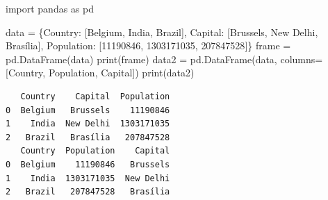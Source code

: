 \documentclass[
  polish,
  letterpaper,
  DIV=11,
  numbers=noendperiod]{scrreprt}
\newenvironment{Shaded}{\begin{snugshade}}{\end{snugshade}}
\newcommand{\BuiltInTok}[1]{\textcolor[rgb]{0.00,0.23,0.31}{#1}}
\newcommand{\DecValTok}[1]{\textcolor[rgb]{0.68,0.00,0.00}{#1}}
\newcommand{\ImportTok}[1]{\textcolor[rgb]{0.00,0.46,0.62}{#1}}
\newcommand{\NormalTok}[1]{\textcolor[rgb]{0.00,0.23,0.31}{#1}}
\newcommand{\OperatorTok}[1]{\textcolor[rgb]{0.37,0.37,0.37}{#1}}
\newcommand{\StringTok}[1]{\textcolor[rgb]{0.13,0.47,0.30}{#1}}
\begin{document}
\begin{Shaded}
\begin{Highlighting}[]
\ImportTok{import}\NormalTok{ pandas }\ImportTok{as}\NormalTok{ pd}

\NormalTok{data }\OperatorTok{=}\NormalTok{ \{}\StringTok{\textquotesingle{}Country\textquotesingle{}}\NormalTok{: [}\StringTok{\textquotesingle{}Belgium\textquotesingle{}}\NormalTok{, }\StringTok{\textquotesingle{}India\textquotesingle{}}\NormalTok{, }\StringTok{\textquotesingle{}Brazil\textquotesingle{}}\NormalTok{],}
        \StringTok{\textquotesingle{}Capital\textquotesingle{}}\NormalTok{: [}\StringTok{\textquotesingle{}Brussels\textquotesingle{}}\NormalTok{, }\StringTok{\textquotesingle{}New Delhi\textquotesingle{}}\NormalTok{, }\StringTok{\textquotesingle{}Brasília\textquotesingle{}}\NormalTok{],}
        \StringTok{\textquotesingle{}Population\textquotesingle{}}\NormalTok{: [}\DecValTok{11190846}\NormalTok{, }\DecValTok{1303171035}\NormalTok{, }\DecValTok{207847528}\NormalTok{]\}}
\NormalTok{frame }\OperatorTok{=}\NormalTok{ pd.DataFrame(data)}
\BuiltInTok{print}\NormalTok{(frame)}
\NormalTok{data2 }\OperatorTok{=}\NormalTok{ pd.DataFrame(data, columns}\OperatorTok{=}\NormalTok{[}\StringTok{\textquotesingle{}Country\textquotesingle{}}\NormalTok{, }\StringTok{\textquotesingle{}Population\textquotesingle{}}\NormalTok{, }\StringTok{\textquotesingle{}Capital\textquotesingle{}}\NormalTok{])}
\BuiltInTok{print}\NormalTok{(data2)}
\end{Highlighting}
\end{Shaded}

\begin{verbatim}
   Country    Capital  Population
0  Belgium   Brussels    11190846
1    India  New Delhi  1303171035
2   Brazil   Brasília   207847528
   Country  Population    Capital
0  Belgium    11190846   Brussels
1    India  1303171035  New Delhi
2   Brazil   207847528   Brasília
\end{verbatim}
\end{document}
